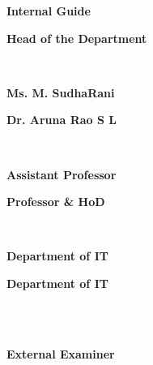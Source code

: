 \documentclass[12pt, English]{article}
\begin{document}
\begin{titlepage}
\vspace*{0.6in}
\noindent
{\begin{normalsize}
{\textbf{Internal Guide}}
\end{normalsize}
}
\hfill
{
\begin{normalsize}
\textbf{ Head of the Department}
\end{normalsize}
}\\
\noindent
{\begin{normalsize}
{\textbf{Ms. M. SudhaRani }}
\end{normalsize}
}
\hfill
{
\begin{normalsize}
\textbf{Dr. Aruna Rao S L}
\end{normalsize}
}\\
\noindent
{\begin{normalsize}
{\textbf{Assistant Professor}}
\end{normalsize}
}
\hspace{9.4cm}
{
\begin{normalsize}
\textbf{Professor \& HoD }
\end{normalsize}
}\\
\noindent
{\begin{normalsize}
{\textbf{Department of IT}}
\end{normalsize}
}
\hspace{9.8cm}
{
\begin{normalsize}
{\textbf{Department of IT}}
\end{normalsize}
}\\
\\
\noindent
{\begin{center}
{\textbf {External Examiner}}
\end{center}

}

\end{titlepage}
\end{document}
